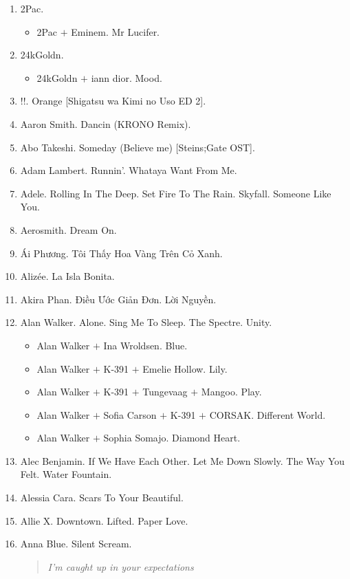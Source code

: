 \documentclass{article}
\begin{document}
\begin{enumerate}
	\item {\sc 2Pac.}
	\begin{itemize}
		\item {\sc 2Pac $+$ Eminem.} Mr Lucifer.
	\end{itemize}
	\item {\sc 24kGoldn.}
	\begin{itemize}
		\item {\sc 24kGoldn $+$ iann dior.} Mood.
	\end{itemize}
	\item {!!.} Orange [Shigatsu wa Kimi no Uso ED 2].
	\item {\sc Aaron Smith.} Dancin (KRONO Remix).
	\item {\sc Abo Takeshi.} Someday (Believe me) [Steins;Gate OST].
	\item {\sc Adam Lambert.} Runnin'. Whataya Want From Me.
	\item {\sc Adele.} Rolling In The Deep. Set Fire To The Rain. Skyfall. Someone Like You.
	\item {\sc Aerosmith.} Dream On.
	\item {\sc Ái Phương.} Tôi Thấy Hoa Vàng Trên Cỏ Xanh.
	\item {\sc Alizée.} La Isla Bonita.
	\item {\sc Akira Phan.} Điều Ước Giản Đơn. Lời Nguyền.
	\item {\sc Alan Walker.} Alone. Sing Me To Sleep. The Spectre. Unity.
	\begin{itemize}
		\item {\sc Alan Walker $+$ Ina Wroldsen.} Blue.
		\item {\sc Alan Walker $+$ K-391 $+$ Emelie Hollow.} Lily.
		\item {\sc Alan Walker $+$ K-391 $+$ Tungevaag $+$ Mangoo.} Play.
		\item {\sc Alan Walker $+$ Sofia Carson $+$ K-391 $+$ CORSAK.} Different World.
		\item {\sc Alan Walker $+$ Sophia Somajo.} Diamond Heart.
	\end{itemize}
	\item {\sc Alec Benjamin.} If We Have Each Other. Let Me Down Slowly. The Way You Felt. Water Fountain.
	\item {\sc Alessia Cara.} Scars To Your Beautiful.
	\item {\sc Allie X.} Downtown. Lifted. Paper Love.
	\item {\sc Anna Blue.} Silent Scream.
	\begin{quotation}\it
		I'm caught up in your expectations
		

\end{quotation}
\end{enumerate}
\end{document}
